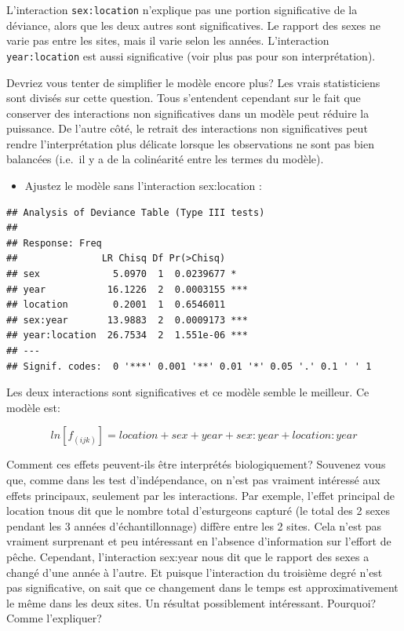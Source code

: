 \documentclass[12pt,]{book}
\providecommand{\tightlist}{%
  \setlength{\itemsep}{0pt}\setlength{\parskip}{0pt}}
\begin{document}
L'interaction \texttt{sex:location} n'explique pas une portion significative de la déviance, alors que les deux autres sont significatives. Le rapport des sexes ne varie pas entre les sites, mais il varie selon les années. L'interaction \texttt{year:location} est aussi significative (voir plus pas pour son interprétation).

Devriez vous tenter de simplifier le modèle encore plus? Les vrais statisticiens sont divisés sur cette question. Tous s'entendent cependant sur le fait que conserver des interactions non significatives dans un modèle peut réduire la puissance. De l'autre côté, le retrait des interactions non significatives peut rendre l'interprétation plus délicate lorsque les observations ne sont pas bien balancées (i.e.~il y a de la colinéarité entre les termes du modèle).

\begin{itemize}
\tightlist
\item
  Ajustez le modèle sans l'interaction sex:location :
\end{itemize}

\begin{verbatim}
## Analysis of Deviance Table (Type III tests)
## 
## Response: Freq
##               LR Chisq Df Pr(>Chisq)    
## sex             5.0970  1  0.0239677 *  
## year           16.1226  2  0.0003155 ***
## location        0.2001  1  0.6546011    
## sex:year       13.9883  2  0.0009173 ***
## year:location  26.7534  2  1.551e-06 ***
## ---
## Signif. codes:  0 '***' 0.001 '**' 0.01 '*' 0.05 '.' 0.1 ' ' 1
\end{verbatim}

Les deux interactions sont significatives et ce modèle semble le meilleur. Ce modèle est:

\[ln[f_{(ijk)} ] = location + sex + year + sex:year + location:year\]

Comment ces effets peuvent-ils être interprétés biologiquement? Souvenez vous que, comme dans les test d'indépendance, on n'est pas vraiment intéressé aux effets principaux, seulement par les interactions. Par exemple, l'effet principal de location tnous dit que le nombre total d'esturgeons capturé (le total des 2 sexes pendant les 3 années d'échantillonnage) diffère entre les 2 sites. Cela n'est pas vraiment surprenant et peu intéressant en l'absence d'information sur l'effort de pêche. Cependant, l'interaction sex:year nous dit que le rapport des sexes a changé d'une année à l'autre. Et puisque l'interaction du troisième degré n'est pas significative, on sait que ce changement dans le temps est approximativement le même dans les deux sites. Un résultat possiblement intéressant. Pourquoi? Comme l'expliquer?
\end{document}
